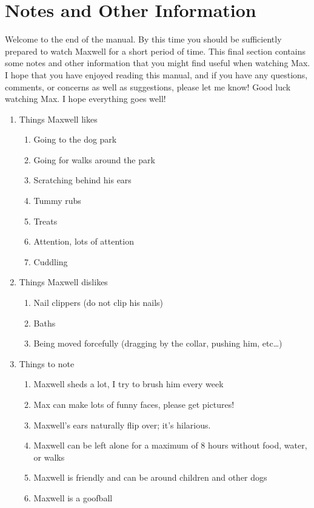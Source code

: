 \documentclass[pdftex,12pt]{article}
\begin{document}
\clearpage
\section{Notes and Other Information}

Welcome to the end of the manual.
By this time you should be sufficiently prepared to watch Maxwell for a short period of time.
This final section contains some notes and other information that you might find useful when watching Max.
I hope that you have enjoyed reading this manual, and if you have any questions, comments, or concerns as well as suggestions, please let me know!
Good luck watching Max.
I hope everything goes well!

\bigskip

\begin{enumerate}\label{itm:other_information}
    \item Things Maxwell likes
        \begin{enumerate}
            \item Going to the dog park
            \item Going for walks around the park
            \item Scratching behind his ears
            \item Tummy rubs
            \item Treats
            \item Attention, lots of attention
            \item Cuddling
        \end{enumerate}
    \item Things Maxwell dislikes
        \begin{enumerate}
            \item Nail clippers (do not clip his nails)
            \item Baths
            \item Being moved forcefully (dragging by the collar, pushing him, etc\ldots)
        \end{enumerate}
    \item Things to note
        \begin{enumerate}
            \item Maxwell sheds a lot, I try to brush him every week
            \item Max can make lots of funny faces, please get pictures!
            \item Maxwell's ears naturally flip over; it's hilarious.
            \item Maxwell can be left alone for a maximum of 8 hours without food, water, or walks
            \item Maxwell is friendly and can be around children and other dogs
            \item Maxwell is a goofball
        \end{enumerate}
\end{enumerate}
\end{document}

